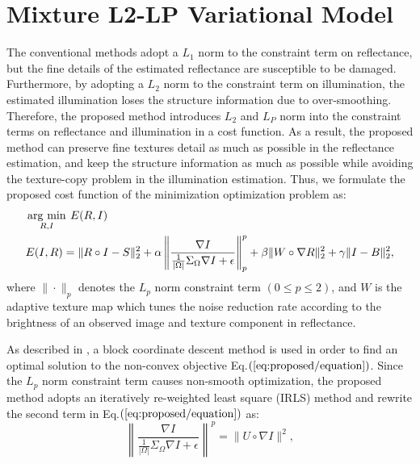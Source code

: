 \section{Mixture L2-LP Variational Model} \label{sec:L2-LP}
The conventional methods adopt a $L_{1}$ norm to the constraint term on reflectance, but the fine details of the estimated reflectance are susceptible to be damaged. Furthermore, by adopting a $L_{2}$ norm to the constraint term on illumination, the estimated illumination loses the structure information due to over-smoothing. Therefore, the proposed method introduces $L_{2}$ and $L_{P}$ norm into the constraint terms on reflectance and illumination in a cost function. As a result, the proposed method can preserve fine textures detail as much as possible in the reflectance estimation, and keep the structure information as much as possible while avoiding the texture-copy problem in the illumination estimation. Thus, we formulate the proposed cost function of the minimization optimization problem as:
\begin{equation}
\begin{split}
	&\mathop{\rm arg~min}\limits_{R, I}{\:E(R, I)}\\
	&E(I, R) = \|R \circ I - S\|_{2}^{2} + \alpha \left \|\frac{\nabla{I}}{\frac{1}{|\Omega|}\Sigma_{\Omega}\nabla{I}+\epsilon}\right\|_{p}^{p} + \beta \|W \circ \nabla{R}\|_{2}^{2} + \gamma \|I - B\|_{2}^{2}, \label{eq:proposed/equation}
\end{split}
\end{equation}
where $\| \cdot \|_{p}$ denotes the $L_{p}$ norm constraint term $(0 \leq p \leq 2)$, and $W$ is the adaptive texture map which tunes the noise reduction rate according to the brightness of an observed image and texture component in reflectance.\par
As described in \cite{l2-lp}, a block coordinate descent method \cite{block} is used in order to find an optimal solution to the non-convex objective Eq.$(\ref{eq:proposed/equation})$. Since the $L_{p}$ norm constraint term causes non-smooth optimization, the proposed method adopts an iteratively re-weighted least square (IRLS) method \cite{iterate} and rewrite the second term in Eq.$(\ref{eq:proposed/equation})$ as:
\begin{equation}
\left \|\frac{\nabla{I}}{\frac{1}{|\Omega|}\Sigma_{\Omega}\nabla{I}+\epsilon}\right\|^{p} = \|U \circ \nabla{I}\|^{2}, \label{eq:approximation}
\end{equation}

